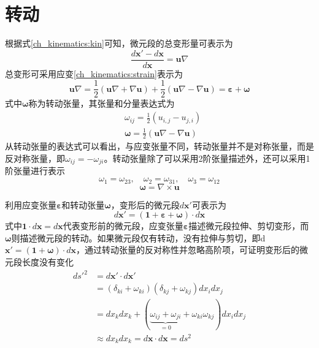 \section{转动}
根据式\eqref{ch_kinematics:kin}可知，微元段的总变形量可表示为
\begin{equation}
\frac{d\boldsymbol x'-d\boldsymbol x}{d\boldsymbol x} = \boldsymbol u \nabla
\end{equation}
总变形可采用应变\eqref{ch_kinematics:strain}表示为
\begin{equation}
\boldsymbol u \nabla = \frac{1}{2}(\boldsymbol u \nabla + \nabla \boldsymbol u) + \frac{1}{2}(\boldsymbol u \nabla - \nabla \boldsymbol u) = \boldsymbol \varepsilon + \boldsymbol \omega
\end{equation}
式中$\boldsymbol \omega$称为转动张量，其张量和分量表达式为
\begin{subequations}\label{ch_kinematics:rotation}
\begin{align}
&\omega_{ij} = \frac{1}{2}(u_{i,j}-u_{j,i}) \\
&\boldsymbol \omega = \frac{1}{2}(\boldsymbol u \nabla - \nabla \boldsymbol u)
\end{align}
\end{subequations}
从转动张量的表达式可以看出，与应变张量不同，转动张量并不是对称张量，而是反对称张量，即$\omega_{ij}=-\omega_{ji}$。转动张量除了可以采用2阶张量描述外，还可以采用1阶张量进行表示
\begin{equation}
    \omega_1 = \omega_{23},\quad \omega_2 = \omega_{31},\quad \omega_3 = \omega_{12}
\end{equation}
\begin{equation}
    \boldsymbol \omega = \nabla \times \boldsymbol u
\end{equation}\par
利用应变张量$\boldsymbol \varepsilon$和转动张量$\boldsymbol \omega$，变形后的微元段$d\boldsymbol x'$可表示为
\begin{equation}
d\boldsymbol x' = (\boldsymbol 1 + \boldsymbol \varepsilon + \boldsymbol \omega) \cdot d\boldsymbol x
\end{equation}
式中$\boldsymbol 1 \cdot d\boldsymbol x=d\boldsymbol x$代表变形前的微元段，应变张量$\boldsymbol \varepsilon$描述微元段拉伸、剪切变形，而$\boldsymbol \omega$则描述微元段的转动。如果微元段仅有转动，没有拉伸与剪切，即d$\boldsymbol x' = (\boldsymbol 1 + \boldsymbol \omega)\cdot d\boldsymbol x$，通过转动张量的反对称性并忽略高阶项，可证明变形后的微元段长度没有变化
\begin{equation}
\begin{split}
    ds'^2 &= d\boldsymbol x' \cdot d\boldsymbol x' \\
          &= (\delta_{ki}+\omega_{ki})(\delta_{kj}+\omega_{kj}) dx_i dx_j \\
          &= dx_k dx_k + (\underbrace{\omega_{ij}+\omega_{ji}}_{=0}+\omega_{ki}\omega_{kj}) dx_i dx_j \\
          &\approx dx_k dx_k = d\boldsymbol x \cdot d\boldsymbol x = ds^2
\end{split}
\end{equation}

